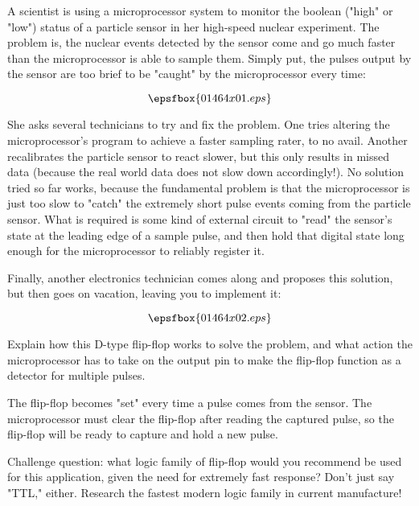 

A scientist is using a microprocessor system to monitor the boolean ("high" or "low") status of a particle sensor in her high-speed nuclear experiment.  The problem is, the nuclear events detected by the sensor come and go much faster than the microprocessor is able to sample them.  Simply put, the pulses output by the sensor are too brief to be "caught" by the microprocessor every time:

$$\epsfbox{01464x01.eps}$$

She asks several technicians to try and fix the problem.  One tries altering the microprocessor's program to achieve a faster sampling rater, to no avail.  Another recalibrates the particle sensor to react slower, but this only results in missed data (because the real world data does not slow down accordingly!).  No solution tried so far works, because the fundamental problem is that the microprocessor is just too slow to "catch" the extremely short pulse events coming from the particle sensor.  What is required is some kind of external circuit to "read" the sensor's state at the leading edge of a sample pulse, and then hold that digital state long enough for the microprocessor to reliably register it.

Finally, another electronics technician comes along and proposes this solution, but then goes on vacation, leaving you to implement it:

$$\epsfbox{01464x02.eps}$$

Explain how this D-type flip-flop works to solve the problem, and what action the microprocessor has to take on the output pin to make the flip-flop function as a detector for multiple pulses.







The flip-flop becomes "set" every time a pulse comes from the sensor.  The microprocessor must clear the flip-flop after reading the captured pulse, so the flip-flop will be ready to capture and hold a new pulse.

\vskip 10pt

Challenge question: what logic family of flip-flop would you recommend be used for this application, given the need for extremely fast response?  Don't just say "TTL," either.  Research the fastest modern logic family in current manufacture!

